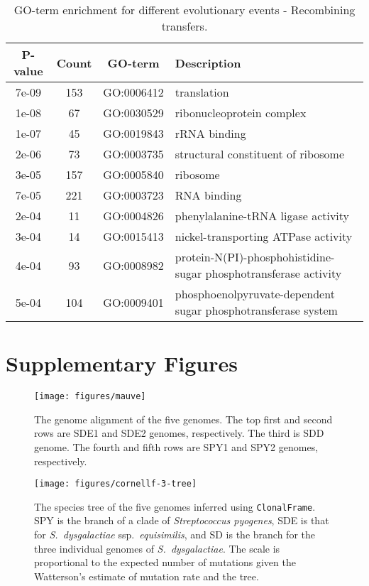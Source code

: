 \documentclass[english]{article}
\begin{document}
%
\begin{table}
\caption{\label{tab:go-events-recombining}GO-term enrichment for different
evolutionary events - Recombining transfers.}
\begin{tabular}{cccl}
\hline 
P-value & Count & GO-term & Description \\
\hline 
7e-09 & 153 & GO:0006412 & translation\\
1e-08 &  67 & GO:0030529 & ribonucleoprotein complex\\
1e-07 &  45 & GO:0019843 & rRNA binding\\
2e-06 &  73 & GO:0003735 & structural constituent of ribosome\\
3e-05 & 157 & GO:0005840 & ribosome\\
7e-05 & 221 & GO:0003723 & RNA binding\\
2e-04 &  11 & GO:0004826 & phenylalanine-tRNA ligase activity\\
3e-04 &  14 & GO:0015413 & nickel-transporting ATPase activity\\
4e-04 &  93 & GO:0008982 & protein-N(PI)-phosphohistidine-sugar phosphotransferase activity\\
5e-04 & 104 & GO:0009401 & phosphoenolpyruvate-dependent sugar phosphotransferase system\\
\hline 
\end{tabular}
\end{table}
\clearpage{}

\section*{Supplementary Figures}

\clearpage{}

\begin{figure}
\begin{center}
\texttt{[image: figures/mauve]}
\end{center}
\caption{\label{fig:mauve}The genome alignment of the five genomes. The top
first and second rows are SDE1 and SDE2 genomes, respectively. The third is SDD
genome. The fourth and fifth rows are SPY1 and SPY2 genomes, respectively.}
\end{figure}
\clearpage{}

\begin{figure}
\texttt{[image: figures/cornellf-3-tree]}
\caption{\label{fig:tree5}The species tree of the five genomes inferred using
\texttt{ClonalFrame}.  SPY is the branch of a clade of \textit{Streptococcus
pyogenes}, SDE is that for \textit{S.\ dysgalactiae} ssp.\textit{\ equisimilis},
and SD is the branch for the three individual genomes of \textit{S.\
dysgalactiae}. The scale is proportional to the expected number of mutations
given the Watterson's estimate of mutation rate and the tree.}
\end{figure}
\clearpage{}%
\end{document}
